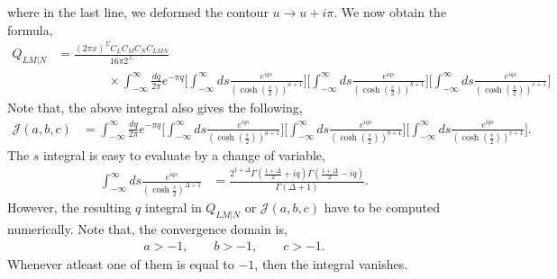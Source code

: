 \documentclass[11pt]{article}
\newcommand{\nn}{\nonumber}
\newcommand{\lb}{\left(}
\newcommand{\rb}{\right)}
\begin{document}
where in the last line, we deformed the contour $u \to u + i\pi$. We now obtain the formula,
\begin{align}
    Q_{LM|N}&= \frac{(2\pi x)^\Sigma C_LC_MC_NC_{LMN}}{16\pi 2^\Sigma} \nn\\&\qquad\qquad\times\int_{-\infty}^\infty\frac{dq}{2\pi}e^{-\pi q}  \Bigg[\int_{-\infty}^\infty ds\frac{e^{iqs}}{\lb\cosh\lb\frac{s}{2}\rb\rb^{a+1}}\Bigg]\Bigg[\int_{-\infty}^\infty ds\frac{e^{iqs}}{\lb\cosh\lb\frac{s}{2}\rb\rb^{b+1}}\Bigg] \Bigg[\int_{-\infty}^\infty ds\frac{e^{iqs}}{\lb\cosh\lb\frac{s}{2}\rb\rb^{c+1}}\Bigg]
\end{align}
Note that, the above integral also gives the following,
\begin{align}
    \mathcal{J}(a,b,c) &= \int_{-\infty}^\infty\frac{dq}{2\pi}e^{-\pi q}  \Bigg[\int_{-\infty}^\infty ds\frac{e^{iqs}}{\lb\cosh\lb\frac{s}{2}\rb\rb^{a+1}}\Bigg]\Bigg[\int_{-\infty}^\infty ds\frac{e^{iqs}}{\lb\cosh\lb\frac{s}{2}\rb\rb^{b+1}}\Bigg] \Bigg[\int_{-\infty}^\infty ds\frac{e^{iqs}}{\lb\cosh\lb\frac{s}{2}\rb\rb^{c+1}}\Bigg].
\end{align}
The $s$ integral is easy to evaluate by a change of variable, 
\begin{align}
    \int_{-\infty}^\infty ds \frac{e^{iqs}}{\lb\cosh\frac{s}{2}\rb^{\Delta +1}} &= \frac{2^{1+\Delta}\Gamma\lb\frac{1+\Delta}{2}+ iq\rb\Gamma\lb\frac{1+\Delta}{2}-iq\rb}{\Gamma\lb\Delta +1\rb}.
\end{align}
However, the resulting $q$ integral in $Q_{LM|N}$ or $\mathcal{J}(a,b,c)$ have to be computed numerically. Note that, the convergence domain is,
\begin{align}
    a>-1, \qquad b>-1, \qquad c>-1. 
\end{align}
Whenever atleast one of them is equal to $-1$, then the integral vanishes.
\end{document}
